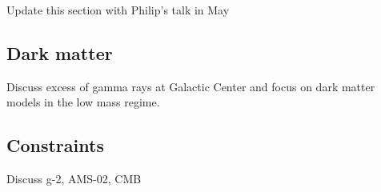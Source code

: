 Update this section with Philip's talk in May
\subsection{Dark matter}
Discuss excess of gamma rays at Galactic Center and focus on dark matter models in the low mass regime. 
\subsection{Constraints}
Discuss g-2, AMS-02, CMB 

